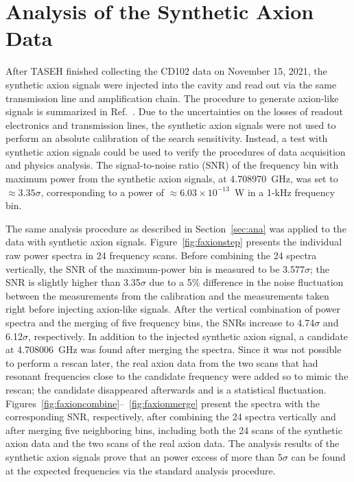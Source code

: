 \section{Analysis of the Synthetic Axion Data}\label{sec:faxion}
After TASEH finished collecting the CD102 data on November 15, 2021, 
the synthetic axion signals were injected into the cavity and read out via the 
same transmission line and amplification chain. The procedure 
to generate axion-like signals is summarized in 
Ref.~\cite{TASEHInstrumentation}. 
Due to the uncertainties on the losses of readout electronics and transmission
 lines, the synthetic axion signals were not used to perform an absolute 
calibration of the search sensitivity. Instead, 
a test with synthetic axion signals could be used to verify the procedures of 
data acquisition and physics analysis. The 
signal-to-noise ratio (SNR) of the frequency bin with maximum power from the 
synthetic axion signals, at 4.708970~GHz, was set to $\approx 3.35\sigma$, 
corresponding to a power of $\approx 6.03 \times 10^{-13}$~W in a 1-kHz 
frequency bin.  

The same analysis procedure as described in Section~\ref{sec:ana} was applied 
to the data with synthetic axion signals. 
Figure~\ref{fig:faxionstep} presents the individual raw power spectra in 
24 frequency scans. Before combining 
the 24 spectra vertically, the SNR of the maximum-power bin is measured to be 
3.577$\sigma$; the SNR is slightly higher than 3.35$\sigma$ due to a 
5\% difference in the noise fluctuation between the measurements from 
the calibration and the measurements taken 
right before injecting axion-like signals. After the vertical combination 
of power spectra and the merging of five frequency bins, the SNRs increase to 
4.74$\sigma$ and 6.12$\sigma$, respectively. In addition to the 
injected synthetic axion signal, a candidate at 4.708006~GHz was found after 
merging the spectra. Since it was not possible to perform a rescan later, 
the real axion data from the two scans that had resonant frequencies close to 
the candidate frequency were added so to mimic the rescan; the candidate 
 disappeared afterwards and is a statistical fluctuation.  
Figures~\ref{fig:faxioncombine}--~\ref{fig:faxionmerge} present 
the spectra with the corresponding SNR, respectively, after combining the 24 
spectra vertically and after merging five neighboring bins, 
including both the 24 scans of the synthetic axion data and the two scans 
of the real axion data. 
The analysis results of the synthetic axion signals prove that an power 
excess of more than 5$\sigma$ can be found at the expected frequencies via 
the standard analysis procedure.  

